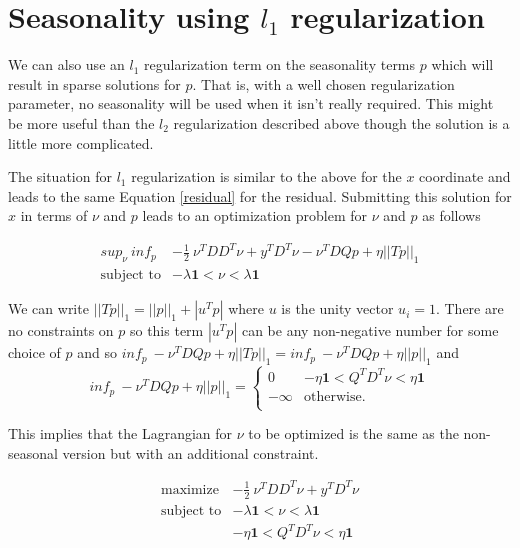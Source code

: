 \documentclass{article}
\begin{document}
\section{Seasonality using $l_1$ regularization}
We can also use an $l_1$ regularization term on the seasonality terms $p$ which will result in
sparse solutions for $p$. That is, with a well chosen regularization parameter,
no seasonality will be used when it isn't really required. This might be more useful than the $l_2$
regularization described above though the solution is a little more complicated.

The situation for $l_1$ regularization is similar to the above for the $x$ coordinate and leads to the
same Equation \ref{residual} for the residual. Submitting this solution for $x$ in terms of $\nu$ and $p$
leads to an optimization problem for $\nu$ and $p$ as follows

\begin{eqnarray}
sup_{\nu} ~ inf_p & -\frac{1}{2} ~ \nu^T D D^T \nu + y^T D^T \nu -\nu^T D Q p + \eta ||T p||_1 \\
\mbox{subject to} & - \lambda \mathbf{1} < \nu < \lambda \mathbf{1}
\end{eqnarray}

We can write $||T p||_1 = ||p||_1 + |u^T p| $ where $u$ is the unity vector $u_i=1$. There are no constraints on
$p$ so this term $|u^T p|$ can be any non-negative number for some choice of $p$ and so
$inf_{p} ~  -\nu^T D Q p + \eta ||T p||_1 = inf_{p} ~  -\nu^T D Q p + \eta ||p||_1 $ and
\[
inf_{p} ~  -\nu^T D Q p + \eta ||p||_1 =
    \left\{
    \begin{array}{ll}
    0 &  - \eta \mathbf{1} <  Q^T D^T \nu < \eta \mathbf{1} \\
  -\infty  & \mbox{otherwise.} \\
  \end{array}
  \right.
\]

This implies that the Lagrangian for $\nu$ to be optimized is the same as the non-seasonal
version but with an additional constraint.

\begin{eqnarray}
\mbox{maximize} & - \frac{1}{2} ~ \nu^T D D^T \nu + y^T D^T \nu \\
\mbox{subject to} & - \lambda \mathbf{1} < \nu < \lambda \mathbf{1} \\
& - \eta \mathbf{1} < Q^T D^T \nu < \eta \mathbf{1} \\
\end{eqnarray}
\end{document}
